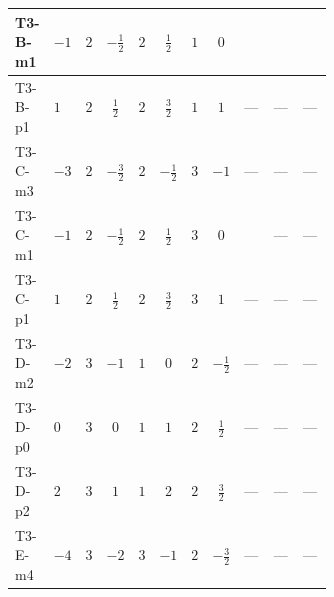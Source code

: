 \documentclass[8pt]{article}
\begin{document}
\begin{landscape}
\begin{longtable}{@{}llcccccc >{\raggedright\arraybackslash}p{0.21\linewidth} >{\raggedright\arraybackslash}p{0.21\linewidth} >{\raggedright\arraybackslash}p{0.21\linewidth}@{}}
T3-B-m1 & $-1$ & $2$ & $-\frac{1}{2}$ & $2$ & $\frac{1}{2}$ & $1$ & $0$ & \scriptsize\adjustbox{max width=\linewidth}{$\begin{gathered} +{\lambda_{HS_2}^{(A)}} \left(-\frac{3}{8} \operatorname{Tr}\!\left({y_2}\,\left({y_1}\right)^{\dagger}\right)-\frac{3 {\lambda_{H H^\dagger S_1^\dagger S_2^\dagger}^{\rm Cross}}}{2}-\frac{3 {\lambda_{10}}}{4}\right)\end{gathered}$} & \scriptsize\adjustbox{max width=\linewidth}{$\begin{gathered} +{\lambda_{H H^\dagger S_1^\dagger S_2^\dagger}^{\rm Cross}} (T_{\nu}^{(1)}+T_{\nu}^{(2)}+6 \operatorname{Tr}\!\left({Y_d}\,\left({Y_d}\right)^{\dagger}\right)+2 \operatorname{Tr}\!\left({Y_e}\,\left({Y_e}\right)^{\dagger}\right)+6 \operatorname{Tr}\!\left({Y_u}\,\left({Y_u}\right)^{\dagger}\right))\end{gathered}$} & \scriptsize\adjustbox{max width=\linewidth}{$\begin{gathered} -4 \operatorname{Tr}\!\left({y_2}\,\left({y_1}\right)^{\dagger}\,{Y_e}\,\left({Y_e}\right)^{\dagger}\right)\end{gathered}$} \\
\midrule
T3-B-p1 & $1$ & $2$ & $\frac{1}{2}$ & $2$ & $\frac{3}{2}$ & $1$ & $1$ & --- & --- & --- \\
\midrule
T3-C-m3 & $-3$ & $2$ & $-\frac{3}{2}$ & $2$ & $-\frac{1}{2}$ & $3$ & $-1$ & --- & --- & --- \\
\midrule
T3-C-m1 & $-1$ & $2$ & $-\frac{1}{2}$ & $2$ & $\frac{1}{2}$ & $3$ & $0$ & \scriptsize\adjustbox{max width=\linewidth}{$\begin{gathered} +{\lambda_{HS_2}^{(A)}} \left(-\frac{9}{16} \operatorname{Tr}\!\left({y_2}\,\left({y_1}\right)^{\dagger}\right)-\frac{3 {\lambda_{H H^\dagger S_1^\dagger S_2^\dagger}^{\rm Cross}}}{2}-\frac{3 {\lambda_{10}}}{4}\right)\end{gathered}$} & --- & --- \\
\midrule
T3-C-p1 & $1$ & $2$ & $\frac{1}{2}$ & $2$ & $\frac{3}{2}$ & $3$ & $1$ & --- & --- & --- \\
\midrule
T3-D-m2 & $-2$ & $3$ & $-1$ & $1$ & $0$ & $2$ & $-\frac{1}{2}$ & --- & --- & --- \\
\midrule
T3-D-p0 & $0$ & $3$ & $0$ & $1$ & $1$ & $2$ & $\frac{1}{2}$ & --- & --- & --- \\
\midrule
T3-D-p2 & $2$ & $3$ & $1$ & $1$ & $2$ & $2$ & $\frac{3}{2}$ & --- & --- & --- \\
\midrule
T3-E-m4 & $-4$ & $3$ & $-2$ & $3$ & $-1$ & $2$ & $-\frac{3}{2}$ & --- & --- & --- \\

\end{longtable}
\end{landscape}
\end{document}
